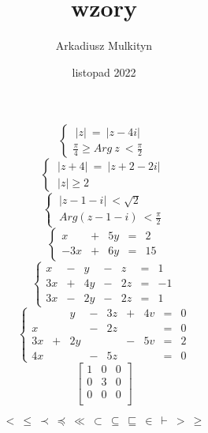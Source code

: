\documentclass[12pt; a4paper; titlepage]{article}
\title{wzory}
\author{Arkadiusz Mulkityn}
\date {listopad 2022}
\begin{document}
$$ 
\left\{
\begin{array}{c}

\ | z |\ = \ | z-4i |\ \\ 
\frac{\pi}{4} \geq Arg \ z \ < \frac{\pi}{2} \


\end{array}
\right.$$
\newline
$$\left\{
\begin{array}{c}

\ | z+4 |\ = \ | z+2-2i |\ \\ 
\ | z | \geq 2


\end{array}
\right.$$
\newline
$$\left\{
\begin{array}{c}

\ | z-1-i |\ < \sqrt{2} \\ 
\ Arg(z-1-i) \ < \frac{\pi}{2}


\end{array}
\right.$$
\newline
$$\left\{
\begin{array}{rrrrrrr}

  x  &+ &5y  &= &2 \\ 
 -3x &+ &6y  &= &15

\end{array}
\right.$$
\newline
$$\left\{
\begin{array}{rrrrrrr}

  x  &- &y  &- &z  &= &1 \\ 
  3x &+ &4y &- &2z &= &-1\\
  3x &- &2y &- &2z &= &1


\end{array}
\right.$$
\newline
$$\left\{
\begin{array}{rrrrrrrrr}

     &	&y 	&-  &3z  &+ &4v &= &0\\ 
  x  &  &   &-  &2z  &  &   &= &0\\
  3x &+ &2y &   &    &- &5v &= &2\\
  4x &  &   &-  &5z  &  &   &= &0


\end{array}
\right.$$
\newline
$$
\left[ \begin{array}{ccc}
1 &0  &0  \\
0 &3  &0  \\
0 &0  &0  \\
\end{array} \right]$$

\newline
$$< \ \leq \ \prec \ \preceq \ \ll \ \subset \ \subseteq \ \sqsubseteq \
\in \ \vdash \ > \ \geq 
$$
\end{document}
